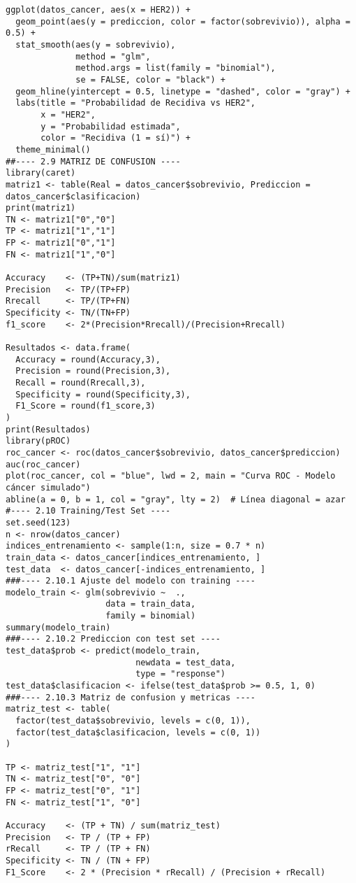 \documentclass[12pt]{article}
\begin{document}
\begin{verbatim}
ggplot(datos_cancer, aes(x = HER2)) +
  geom_point(aes(y = prediccion, color = factor(sobrevivio)), alpha = 0.5) +     
  stat_smooth(aes(y = sobrevivio),
              method = "glm",
              method.args = list(family = "binomial"), 
              se = FALSE, color = "black") +  
  geom_hline(yintercept = 0.5, linetype = "dashed", color = "gray") +
  labs(title = "Probabilidad de Recidiva vs HER2",
       x = "HER2",
       y = "Probabilidad estimada",
       color = "Recidiva (1 = sí)") + 
  theme_minimal()
##---- 2.9 MATRIZ DE CONFUSION ---- 
library(caret)
matriz1 <- table(Real = datos_cancer$sobrevivio, Prediccion = datos_cancer$clasificacion)
print(matriz1)
TN <- matriz1["0","0"]
TP <- matriz1["1","1"]
FP <- matriz1["0","1"]
FN <- matriz1["1","0"]

Accuracy    <- (TP+TN)/sum(matriz1)
Precision   <- TP/(TP+FP)
Rrecall     <- TP/(TP+FN)
Specificity <- TN/(TN+FP)
f1_score    <- 2*(Precision*Rrecall)/(Precision+Rrecall)

Resultados <- data.frame(
  Accuracy = round(Accuracy,3),
  Precision = round(Precision,3),
  Recall = round(Rrecall,3),
  Specificity = round(Specificity,3),
  F1_Score = round(f1_score,3)
)
print(Resultados)
library(pROC)
roc_cancer <- roc(datos_cancer$sobrevivio, datos_cancer$prediccion)
auc(roc_cancer)
plot(roc_cancer, col = "blue", lwd = 2, main = "Curva ROC - Modelo cáncer simulado")
abline(a = 0, b = 1, col = "gray", lty = 2)  # Línea diagonal = azar
#---- 2.10 Training/Test Set ----
set.seed(123)
n <- nrow(datos_cancer)
indices_entrenamiento <- sample(1:n, size = 0.7 * n)
train_data <- datos_cancer[indices_entrenamiento, ]
test_data  <- datos_cancer[-indices_entrenamiento, ]
###---- 2.10.1 Ajuste del modelo con training ----
modelo_train <- glm(sobrevivio ~  .,
                    data = train_data, 
                    family = binomial)
summary(modelo_train)
###---- 2.10.2 Prediccion con test set ----
test_data$prob <- predict(modelo_train, 
                          newdata = test_data, 
                          type = "response")
test_data$clasificacion <- ifelse(test_data$prob >= 0.5, 1, 0)
###---- 2.10.3 Matriz de confusion y metricas ----
matriz_test <- table(
  factor(test_data$sobrevivio, levels = c(0, 1)),
  factor(test_data$clasificacion, levels = c(0, 1))
)

TP <- matriz_test["1", "1"]
TN <- matriz_test["0", "0"]
FP <- matriz_test["0", "1"]
FN <- matriz_test["1", "0"]

Accuracy    <- (TP + TN) / sum(matriz_test)
Precision   <- TP / (TP + FP)
rRecall     <- TP / (TP + FN)
Specificity <- TN / (TN + FP)
F1_Score    <- 2 * (Precision * rRecall) / (Precision + rRecall)


\end{verbatim}
\end{document}

